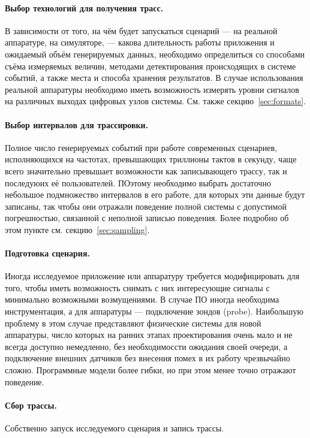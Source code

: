 \paragraph{Выбор технологий для получения трасс.} В зависимости от того, на чём будет запускаться сценарий --- на реальной аппаратуре, на симуляторе, --- какова длительность работы  приложения и ожидаемый объём генерируемых данных, необходимо определиться со способами съёма измеряемых величин, методами детектирования происходящих в системе событий, а также места и способа хранения результатов. В случае использования реальной аппаратуры необходимо иметь возможность измерять уровни сигналов на различных выходах цифровых узлов системы. См. также секцию~\ref{sec:formats}.

\paragraph{Выбор интервалов для трассировки.} Полное число генерируемых событий при работе современных сценариев, исполняющихся на частотах, превышающих триллионы тактов в секунду, чаще всего значительно превышает возможности как записывающего трассу, так и последуюих её пользователей. ПОэтому необходимо выбрать достаточно небольшое подмножество интервалов в его работе, для которых эти данные будут записаны, так чтобы они отражали поведение полной системы с допустимой погрешностью, связанной с неполной записью поведения. Более подробно об этом пункте см. секцию~\ref{sec:sampling}.

\paragraph{Подготовка сценария.} Иногда исследуемое приложение или аппаратуру требуется модифицировать для того, чтобы иметь возможность снимать с них интересующие сигналы с минимально возможными возмущениями. В случае ПО иногда необходима инструментация, а для аппаратуры --- подключение зондов (\abbr probe). Наибольшую проблему в этом случае представляют физические системы для новой аппаратуры, число которых на ранних этапах проектирования очень мало и не всегда доступно немедленно, без необходимоссти ожидания своей очереди, а подключение внешних датчиков без внесения помех в их работу чрезвычайно сложно. Программные модели более гибки, но при этом менее точно отражают поведение.

\paragraph{Сбор трассы.} Собственно запуск исследуемого сценария и запись трассы.

